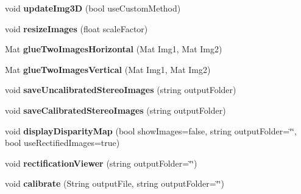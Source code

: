 \begin{DoxyCompactItemize}
\item 
void {\bfseries update\+Img3D} (bool use\+Custom\+Method)\hypertarget{class_stereo_pair_aa64839254e6989452ed547c3d6bfa0b6}{}\label{class_stereo_pair_aa64839254e6989452ed547c3d6bfa0b6}

\item 
void {\bfseries resize\+Images} (float scale\+Factor)\hypertarget{class_stereo_pair_ae667addce0f50877097cb0d7bb883af4}{}\label{class_stereo_pair_ae667addce0f50877097cb0d7bb883af4}

\item 
Mat {\bfseries glue\+Two\+Images\+Horizontal} (Mat Img1, Mat Img2)\hypertarget{class_stereo_pair_ab511ca420600df96b8e86f0e59bbf050}{}\label{class_stereo_pair_ab511ca420600df96b8e86f0e59bbf050}

\item 
Mat {\bfseries glue\+Two\+Images\+Vertical} (Mat Img1, Mat Img2)\hypertarget{class_stereo_pair_a957abbbd218b9bf5d8103ab3e8fc24c4}{}\label{class_stereo_pair_a957abbbd218b9bf5d8103ab3e8fc24c4}

\item 
void {\bfseries save\+Uncalibrated\+Stereo\+Images} (string output\+Folder)\hypertarget{class_stereo_pair_af913ccf1c79a0ba4702a8834142ff108}{}\label{class_stereo_pair_af913ccf1c79a0ba4702a8834142ff108}

\item 
void {\bfseries save\+Calibrated\+Stereo\+Images} (string output\+Folder)\hypertarget{class_stereo_pair_a959f4ce30d54ec653099bf935850b596}{}\label{class_stereo_pair_a959f4ce30d54ec653099bf935850b596}

\item 
void {\bfseries display\+Disparity\+Map} (bool show\+Images=false, string output\+Folder=\char`\"{}\char`\"{}, bool use\+Rectified\+Images=true)\hypertarget{class_stereo_pair_a49ea94ea67bb260244c8949cf67c9e44}{}\label{class_stereo_pair_a49ea94ea67bb260244c8949cf67c9e44}

\item 
void {\bfseries rectification\+Viewer} (string output\+Folder=\char`\"{}\char`\"{})\hypertarget{class_stereo_pair_acb362b0e8a1ede3ca534bef7324b2d0b}{}\label{class_stereo_pair_acb362b0e8a1ede3ca534bef7324b2d0b}

\item 
void {\bfseries calibrate} (String output\+File, string output\+Folder=\char`\"{}\char`\"{})\hypertarget{class_stereo_pair_a2a60ef83617e31c54a33d87d2eafc7b2}{}\label{class_stereo_pair_a2a60ef83617e31c54a33d87d2eafc7b2}


\end{DoxyCompactItemize}
